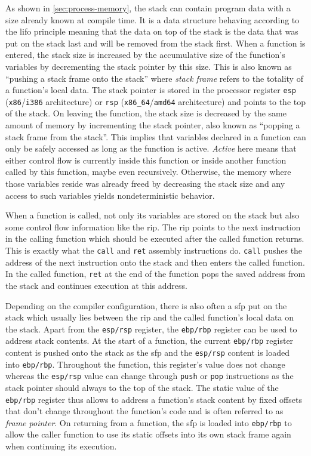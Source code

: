 As shown in \cref{sec:process-memory}, the stack can contain program data with a size already known at compile time.
It is a data structure behaving according to the \gls{lifo} principle meaning that the data on top of the stack is the data that was put on the stack last and will be removed from the stack first.
When a function is entered, the stack size is increased by the accumulative size of the function's variables by decrementing the stack pointer by this size.
This is also known as ``pushing a stack frame onto the stack'' where \emph{stack frame} refers to the totality of a function's local data.
The stack pointer is stored in the processor register \texttt{esp} (\texttt{x86}/\texttt{i386} architecture) or \texttt{rsp} (\texttt{x86\_64}/\texttt{amd64} architecture) and points to the top of the stack.
On leaving the function, the stack size is decreased by the same amount of memory by incrementing the stack pointer, also known as ``popping a stack frame from the stack''.
This implies that variables declared in a function can only be safely accessed as long as the function is active.
\emph{Active} here means that either control flow is currently inside this function or inside another function called by this function, maybe even recursively.
Otherwise, the memory where those variables reside was already freed by decreasing the stack size and any access to such variables yields nondeterministic behavior.

When a function is called, not only its variables are stored on the stack but also some control flow information like the \gls{rip}.
The \gls{rip} points to the next instruction in the calling function which should be executed after the called function returns.
This is exactly what the \texttt{call} and \texttt{ret} assembly instructions do.
\texttt{call} pushes the address of the next instruction onto the stack and then enters the called function.
In the called function, \texttt{ret} at the end of the function pops the saved address from the stack and continues execution at this address.

Depending on the compiler configuration, there is also often a \gls{sfp} put on the stack which usually lies between the \gls{rip} and the called function's local data on the stack.
Apart from the \texttt{esp/rsp} register, the \texttt{ebp/rbp} register can be used to address stack contents.
At the start of a function, the current \texttt{ebp/rbp} register content is pushed onto the stack as the \gls{sfp} and the \texttt{esp/rsp} content is loaded into \texttt{ebp/rbp}.
Throughout the function, this register's value does not change whereas the \texttt{esp/rsp} value can change through \texttt{push} or \texttt{pop} instructions as the stack pointer should always to the top of the stack.
The static value of the \texttt{ebp/rbp} register thus allows to address a function's stack content by fixed offsets that don't change throughout the function's code and is often referred to as \emph{frame pointer}.
On returning from a function, the \gls{sfp} is loaded into \texttt{ebp/rbp} to allow the caller function to use its static offsets into its own stack frame again when continuing its execution.


